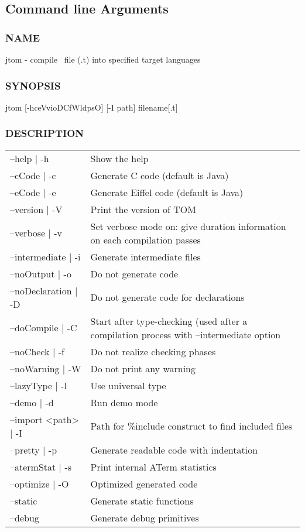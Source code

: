 \subsection{Command line Arguments}
\subsubsection{NAME}
     jtom - compile \TOM\ file (.t) into specified target languages

\subsubsection{SYNOPSIS}
     jtom [-hceVvioDCfWldpsO] [-I path] filename[.t]

\subsubsection{DESCRIPTION}
\begin{tabular}{|l|l|}
\hline
--help | -h&            Show the help \\
--cCode | -c&           Generate C code (default is Java)\\
--eCode | -e&           Generate Eiffel code (default is Java)\\
--version | -V&         Print the version of TOM\\
--verbose | -v&         Set verbose mode on: give duration information
on each compilation passes\\
--intermediate | -i&    Generate intermediate files \\
--noOutput | -o&        Do not generate code \\
--noDeclaration | -D&   Do not generate code for declarations \\
--doCompile | -C&       Start after type-checking (used after a
compilation process with --intermediate option\\
--noCheck | -f&         Do not realize checking phases \\
--noWarning | -W&       Do not print any warning \\
--lazyType | -l&        Use universal type \\
--demo | -d&            Run demo mode \\
--import <path> | -I&   Path for \%include construct to find included files\\
--pretty | -p&          Generate readable code with indentation \\
--atermStat | -s&       Print internal ATerm statistics \\
--optimize | -O&        Optimized generated code \\
--static&               Generate static functions \\
--debug&                Generate debug primitives \\
\hline
\end{tabular}

